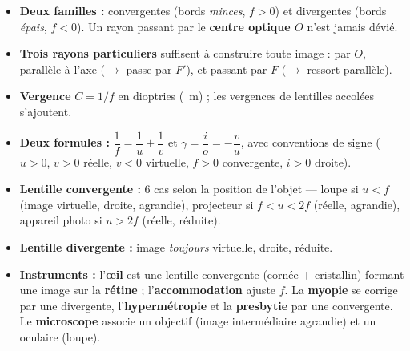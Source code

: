 \documentclass[11pt,a4paper]{article}
\newcommand{\gamm}{\gamma}             %
\begin{document}
\begin{tcolorbox}[boxbase,colback=primarydark!6,colframe=primarydark,
   title={\textsc{L'essentiel de la Fiche 8}}]
\begin{itemize}[leftmargin=1.5em,topsep=2pt,itemsep=2pt]
  \item \textbf{Deux familles :} convergentes (bords \emph{minces}, $f>0$) et divergentes
        (bords \emph{épais}, $f<0$). Un rayon passant par le \textbf{centre optique $O$} n'est jamais dévié.
  \item \textbf{Trois rayons particuliers} suffisent à construire toute image : par $O$, parallèle à
        l'axe ($\to$ passe par $F'$), et passant par $F$ ($\to$ ressort parallèle).
  \item \textbf{Vergence} $C=1/f$ en dioptries (\si{\per\metre}) ; les vergences de lentilles accolées
        s'ajoutent.
  \item \textbf{Deux formules :} $\dfrac{1}{f}=\dfrac{1}{u}+\dfrac{1}{v}$ et
        $\gamm=\dfrac{i}{o}=-\dfrac{v}{u}$, avec conventions de signe ($u>0$, $v>0$ réelle,
        $v<0$ virtuelle, $f>0$ convergente, $i>0$ droite).
  \item \textbf{Lentille convergente :} 6 cas selon la position de l'objet --- loupe si $u<f$ (image
        virtuelle, droite, agrandie), projecteur si $f<u<2f$ (réelle, agrandie), appareil photo si
        $u>2f$ (réelle, réduite).
  \item \textbf{Lentille divergente :} image \emph{toujours} virtuelle, droite, réduite.
  \item \textbf{Instruments :} l'\textbf{œil} est une lentille convergente (cornée $+$ cristallin)
        formant une image sur la \textbf{rétine} ; l'\textbf{accommodation} ajuste $f$. La
        \textbf{myopie} se corrige par une divergente, l'\textbf{hypermétropie} et la \textbf{presbytie}
        par une convergente. Le \textbf{microscope} associe un objectif (image intermédiaire agrandie)
        et un oculaire (loupe).
\end{itemize}
\end{tcolorbox}
\end{document}
